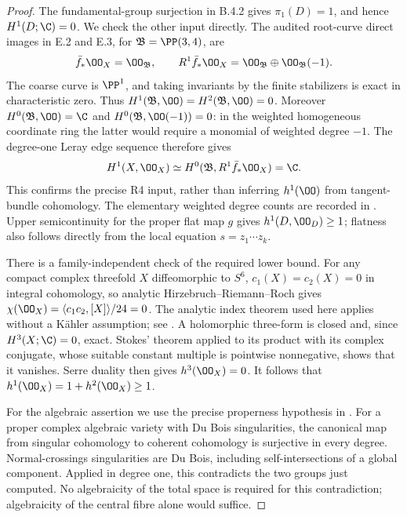 \begin{proof}
The fundamental-group surjection in B.4.2 gives
$\pi_1(D)=1$, and hence $H^1(D;\C)=0$. We check the other
input directly. The audited root-curve direct images in E.2 and
E.3, for $\mathfrak B=\PP(3,4)$, are
\[
 \bar f_*\OO_X=\OO_{\mathfrak B},\qquad
 R^1\bar f_*\OO_X=\OO_{\mathfrak B}\oplus
                          \OO_{\mathfrak B}(-1).
\]
The coarse curve is $\PP^1$, and taking invariants by the finite
stabilizers is exact in characteristic zero. Thus
$H^1(\mathfrak B,\OO)=H^2(\mathfrak B,\OO)=0$.
Moreover $H^0(\mathfrak B,\OO)=\C$ and
$H^0(\mathfrak B,\OO(-1))=0$: in the weighted homogeneous
coordinate ring the latter would require a monomial of weighted
degree $-1$. The degree-one Leray edge sequence therefore gives
\[
 H^1(X,\OO_X)\simeq
 H^0(\mathfrak B,R^1\bar f_*\OO_X)=\C.
\]
This confirms the precise R4 input, rather than inferring
$h^1(\OO)$ from tangent-bundle cohomology. The elementary weighted
degree counts are recorded in .
Upper semicontinuity for the proper flat map $g$ gives
$h^1(D,\OO_D)\geq1$; flatness also follows directly from the
local equation $s=z_1\cdots z_k$.

There is a family-independent check of the required lower bound.
For any compact complex threefold $X$ diffeomorphic to $S^6$,
$c_1(X)=c_2(X)=0$ in integral cohomology, so analytic
Hirzebruch--Riemann--Roch gives
$\chi(\OO_X)=\langle c_1c_2,[X]\rangle/24=0$.
The analytic index theorem used here applies without a K\"ahler
assumption; see \citet[Theorem 4.3]{AtiyahSinger1968IIIE}.
A holomorphic three-form is closed and, since $H^3(X;\C)=0$,
exact. Stokes' theorem applied to its product with its complex
conjugate, whose suitable constant multiple is pointwise
nonnegative, shows that it vanishes. Serre duality then gives
$h^3(\OO_X)=0$. It follows that
$h^1(\OO_X)=1+h^2(\OO_X)\geq1$.

For the algebraic assertion we use the precise properness
hypothesis in \citet[Section 1.D, p.120]{GrafKovacs2014Root}.
For a proper complex algebraic variety with Du Bois singularities,
the canonical map from singular cohomology to coherent cohomology
is surjective in every degree. Normal-crossings singularities are
Du Bois, including self-intersections of a global component.
Applied in degree one, this contradicts the two groups just
computed. No algebraicity of the total space is required for
this contradiction; algebraicity of the central fibre alone
would suffice.


\end{proof}
